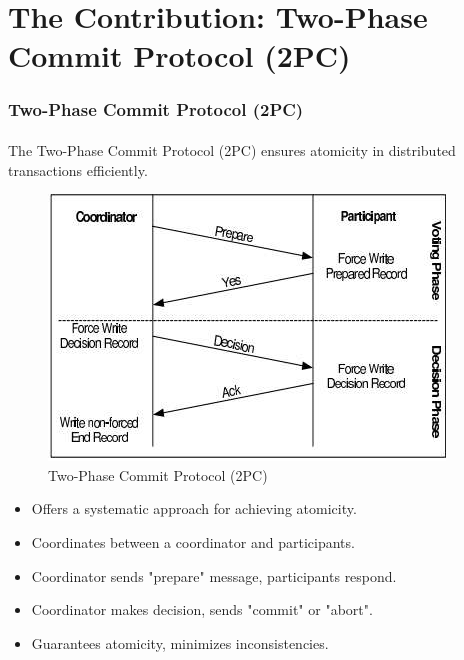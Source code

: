 \documentclass[11pt]{beamer}              %
\begin{document}
\section{The Contribution: Two-Phase Commit Protocol (2PC)}
\begin{frame}
\frametitle{Two-Phase Commit Protocol (2PC)}
\framesubtitle{}
The Two-Phase Commit Protocol (2PC) ensures atomicity in distributed transactions efficiently. 

\begin{figure}
    \centering
    \includegraphics[scale=0.3]{figures/2PC.png}
    \caption{Two-Phase Commit Protocol (2PC)}
    \label{fig:2pc}
\end{figure}
\begin{itemize}
\item Offers a systematic approach for achieving atomicity.
\item Coordinates between a coordinator and participants.
\item Coordinator sends "prepare" message, participants respond.
\item Coordinator makes decision, sends "commit" or "abort".
\item Guarantees atomicity, minimizes inconsistencies.
\end{itemize}

\end{frame}
\end{document}
